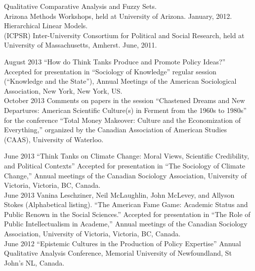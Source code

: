 \documentclass[11pt,usenames,dvipsnames]{article}
\begin{document}
\noindent Qualitative Comparative Analysis and Fuzzy Sets.\\ 
Arizona Methods Workshops, held at University of Arizona. January, 2012.\\

\noindent Hierarchical Linear Models.\\ 
(ICPSR) Inter-University Consortium for Political and Social Research, held at University of Massachusetts, Amherst. June, 2011.\\




\ind August 2013 ``How do Think Tanks Produce and Promote Policy Ideas?'' Accepted for presentation in ``Sociology of Knowledge'' regular session (``Knowledge and the State''), Annual Meetings of the American Sociological Association, New York, New York, US. \\

\ind October 2013 Comments on papers in the session ``Chastened Dreams and New Departures: American Scientific Culture(s) in Ferment from the 1960s to 1980s'' for the conference ``Total Money Makeover: Culture and the Economization of Everything,'' organized by the Canadian Association of American Studies (CAAS), University of Waterloo. \\


\ind June 2013 ``Think Tanks on Climate Change: Moral Views, Scientific Credibility, and Political Contexts'' Accepted for presentation in ``The Sociology of Climate Change,'' Annual meetings of the Canadian Sociology Association, University of Victoria, Victoria, BC, Canada. \\

\ind June 2013 Vanina Leschziner, Neil McLaughlin, John McLevey, and Allyson Stokes (Alphabetical listing). ``The American Fame Game: Academic Status and Public Renown in the Social Sciences.'' Accepted for presentation in ``The Role of Public Intellectualism in Academe,'' Annual meetings of the Canadian Sociology Association, University of Victoria, Victoria, BC, Canada. \\

\ind June 2012 ``Epistemic Cultures in the Production of Policy Expertise'' Annual Qualitative Analysis Conference, Memorial University of Newfoundland, St John's NL, Canada.\\
\end{document}
